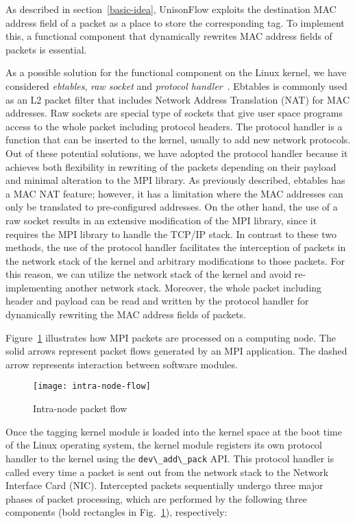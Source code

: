 As described in section~\ref{basic-idea}, UnisonFlow exploits the
destination MAC address field of a packet as a place to store the
corresponding tag. To implement this, a functional component that
dynamically rewrites MAC address fields of packets is essential.

As a possible solution for the functional component on the Linux kernel,
we have considered \emph{ebtables}, \emph{raw socket} and \emph{protocol
handler}~\autocite{Rosen2013}. Ebtables is commonly used as an L2
packet filter that includes Network Address Translation (NAT) for MAC
addresses. Raw sockets are special type of sockets that give user space
programs access to the whole packet including protocol headers. The
protocol handler is a function that can be inserted to the kernel,
usually to add new network protocols. Out of these potential solutions,
we have adopted the protocol handler because it achieves both
flexibility in rewriting of the packets depending on their payload and
minimal alteration to the MPI library. As previously described, ebtables
has a MAC NAT feature; however, it has a limitation where the MAC
addresses can only be translated to pre-configured addresses. On the
other hand, the use of a raw socket results in an extensive modification
of the MPI library, since it requires the MPI library to handle the
TCP/IP stack. In contrast to these two methods, the use of the protocol
handler facilitates the interception of packets in the network stack of
the kernel and arbitrary modifications to those packets. For this
reason, we can utilize the network stack of the kernel and avoid
re-implementing another network stack. Moreover, the whole packet
including header and payload can be read and written by the protocol
handler for dynamically rewriting the MAC address fields of packets.

Figure~\ref{fig:intra-node-flow} illustrates how MPI packets are
processed on a computing node. The solid arrows represent packet flows
generated by an MPI application. The dashed arrow represents interaction
between software modules.

\begin{figure}[htbp]
    \centering
    \texttt{[image: intra-node-flow]}
    \caption{Intra-node packet flow}
    \label{fig:intra-node-flow}
\end{figure}

Once the tagging kernel module is loaded into the kernel space at the
boot time of the Linux operating system, the kernel module registers its
own protocol handler to the kernel using the
\lstinline!dev\_add\_pack! API\@. This protocol handler is
called every time a packet is sent out from the network stack to the
Network Interface Card (NIC). Intercepted packets sequentially undergo
three major phases of packet processing, which are performed by the
following three components (bold rectangles in
Fig.~\ref{fig:intra-node-flow}), respectively:

